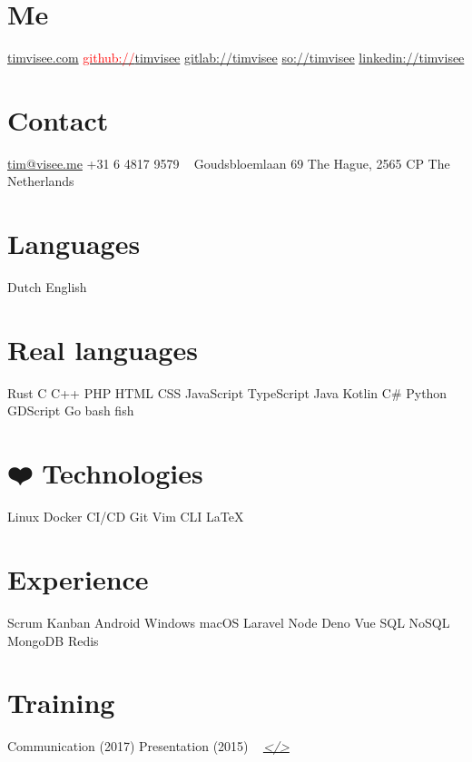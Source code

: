 \documentclass[]{cv-timvisee}
\begin{document}


\begin{aside}
\section{Me}
\href{https://timvisee.com/}{timvisee.com}
\href{https://github.com/timvisee}{\textcolor{red}{github://}timvisee}
\href{https://gitlab.com/timvisee}{gitlab://timvisee}
\href{https://stackoverflow.com/users/1000145}{so://timvisee}
\href{https://linkedin.com/in/timvisee}{linkedin://timvisee}
\section{Contact}
\href{mailto:tim@visee.me}{tim@visee.me}
+31 6 4817 9579
~
Goudsbloemlaan 69
The Hague, 2565 CP
The Netherlands
\section{Languages}
Dutch \textperiodcentered{} English
\section{Real languages}
Rust \textperiodcentered{} C \textperiodcentered{} C++
PHP \textperiodcentered{} HTML \textperiodcentered{} CSS
JavaScript \textperiodcentered{} TypeScript
Java \textperiodcentered{} Kotlin \textperiodcentered{} C\#
Python \textperiodcentered{} GDScript \textperiodcentered{} Go
bash \textperiodcentered{} fish
\section{{\DejaSans ❤️} Technologies}
Linux \textperiodcentered{} Docker \textperiodcentered{} CI/CD
Git \textperiodcentered{} Vim \textperiodcentered{} CLI \textperiodcentered{} \LaTeX{}
\section{Experience}
Scrum \textperiodcentered{} Kanban
Android \textperiodcentered{} Windows \textperiodcentered{} macOS
Laravel \textperiodcentered{} Node \textperiodcentered{} Deno \textperiodcentered{} Vue
SQL \textperiodcentered{} NoSQL
MongoDB \textperiodcentered{} Redis
\section{Training}
Communication (2017)
Presentation (2015)
~
\textit{\href{https://github.com/timvisee/cv}{</>}}
\end{aside}
\end{document}
